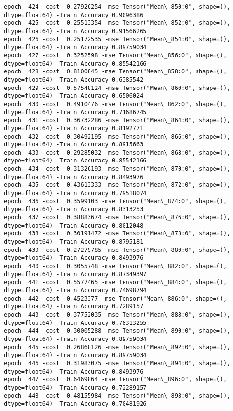 \documentclass[11pt]{article}
\begin{document}
\begin{Verbatim}[commandchars=\\\{\}]
epoch  424 -cost  0.27926254 -mse Tensor("Mean\_850:0", shape=(), dtype=float64) -Train Accuracy 0.9096386
epoch  425 -cost  0.25513354 -mse Tensor("Mean\_852:0", shape=(), dtype=float64) -Train Accuracy 0.91566265
epoch  426 -cost  0.25172535 -mse Tensor("Mean\_854:0", shape=(), dtype=float64) -Train Accuracy 0.89759034
epoch  427 -cost  0.3252598 -mse Tensor("Mean\_856:0", shape=(), dtype=float64) -Train Accuracy 0.85542166
epoch  428 -cost  0.8100845 -mse Tensor("Mean\_858:0", shape=(), dtype=float64) -Train Accuracy 0.6385542
epoch  429 -cost  0.57548124 -mse Tensor("Mean\_860:0", shape=(), dtype=float64) -Train Accuracy 0.6506024
epoch  430 -cost  0.4910476 -mse Tensor("Mean\_862:0", shape=(), dtype=float64) -Train Accuracy 0.71686745
epoch  431 -cost  0.36732286 -mse Tensor("Mean\_864:0", shape=(), dtype=float64) -Train Accuracy 0.8192771
epoch  432 -cost  0.30492195 -mse Tensor("Mean\_866:0", shape=(), dtype=float64) -Train Accuracy 0.8915663
epoch  433 -cost  0.29285032 -mse Tensor("Mean\_868:0", shape=(), dtype=float64) -Train Accuracy 0.85542166
epoch  434 -cost  0.31326193 -mse Tensor("Mean\_870:0", shape=(), dtype=float64) -Train Accuracy 0.8493976
epoch  435 -cost  0.43613333 -mse Tensor("Mean\_872:0", shape=(), dtype=float64) -Train Accuracy 0.79518074
epoch  436 -cost  0.3599103 -mse Tensor("Mean\_874:0", shape=(), dtype=float64) -Train Accuracy 0.8313253
epoch  437 -cost  0.38883674 -mse Tensor("Mean\_876:0", shape=(), dtype=float64) -Train Accuracy 0.8012048
epoch  438 -cost  0.30191472 -mse Tensor("Mean\_878:0", shape=(), dtype=float64) -Train Accuracy 0.8795181
epoch  439 -cost  0.27279785 -mse Tensor("Mean\_880:0", shape=(), dtype=float64) -Train Accuracy 0.8493976
epoch  440 -cost  0.3055748 -mse Tensor("Mean\_882:0", shape=(), dtype=float64) -Train Accuracy 0.87349397
epoch  441 -cost  0.5577465 -mse Tensor("Mean\_884:0", shape=(), dtype=float64) -Train Accuracy 0.74698794
epoch  442 -cost  0.4523377 -mse Tensor("Mean\_886:0", shape=(), dtype=float64) -Train Accuracy 0.7289157
epoch  443 -cost  0.37752035 -mse Tensor("Mean\_888:0", shape=(), dtype=float64) -Train Accuracy 0.78313255
epoch  444 -cost  0.30005288 -mse Tensor("Mean\_890:0", shape=(), dtype=float64) -Train Accuracy 0.89759034
epoch  445 -cost  0.26868126 -mse Tensor("Mean\_892:0", shape=(), dtype=float64) -Train Accuracy 0.89759034
epoch  446 -cost  0.31983075 -mse Tensor("Mean\_894:0", shape=(), dtype=float64) -Train Accuracy 0.8493976
epoch  447 -cost  0.6469864 -mse Tensor("Mean\_896:0", shape=(), dtype=float64) -Train Accuracy 0.72289157
epoch  448 -cost  0.48155984 -mse Tensor("Mean\_898:0", shape=(), dtype=float64) -Train Accuracy 0.70481926

\end{Verbatim}
\end{document}
